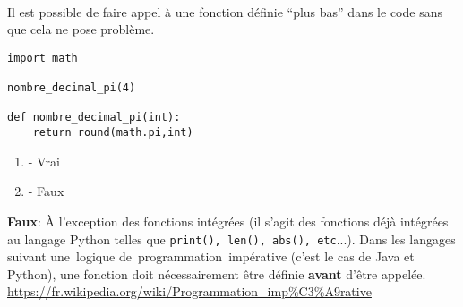 \begin{Exercice}[2 minutes]\\
Il est possible de faire appel à une fonction définie ``plus bas'' dans le code sans que cela ne pose problème.

\begin{lstlisting}
import math

nombre_decimal_pi(4)

def nombre_decimal_pi(int):
    return round(math.pi,int)
\end{lstlisting}

\begin{enumerate}
    \item - Vrai
    \item - Faux
\end{enumerate}
\begin{solution}
    \textbf{Faux}: À l'exception des fonctions intégrées (il s'agit des fonctions déjà intégrées au langage Python telles que \lstinline{print(), len(), abs(), etc}...). Dans les langages suivant une~logique de~programmation~impérative (c'est le cas de Java et Python), une fonction doit nécessairement être définie \textbf{avant} d'être appelée.
    \url{https://fr.wikipedia.org/wiki/Programmation\_imp\%C3\%A9rative}
\end{solution}
\end{Exercice}


